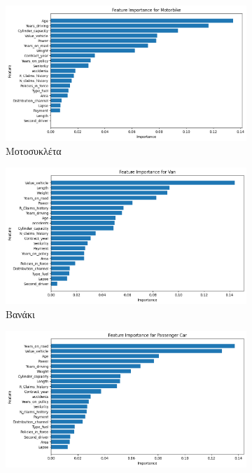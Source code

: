 \documentclass{llncs}
\begin{document}
\begin{figure}
    \centering
     \begin{subfigure}{0.45\linewidth}
      \includegraphics[width=\linewidth]{images/Motorbike_feature_importance_random_forest.png}
      \caption{Μοτοσυκλέτα}
      \label{fig:subrandom1}
     \end{subfigure}
     \begin{subfigure}{0.45\linewidth}
      \includegraphics[width=\linewidth]{images/Van_feature_importance_random_forest.png}
      \caption{Βανάκι}
      \label{fig:subrandom2}
      \end{subfigure}
  \vfill
       \begin{subfigure}{0.45\linewidth}
       \includegraphics[width=\linewidth]{images/Passenger Car_feature_importance_random_forest.png}

\end{subfigure}
\end{figure}
\end{document}
